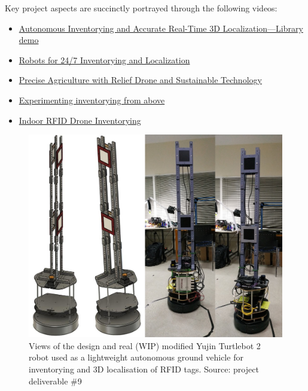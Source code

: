 


Key project aspects are succinctly portrayed through the following videos:

\begin{itemize}
  \singlespacing
  \item \href{https://www.youtube.com/watch?v=bo4lMI640DY}{Autonomous Inventorying and Accurate Real-Time 3D Localization---Library demo}
  \item \href{https://www.facebook.com/watch/?v=960592754415188}{Robots for 24/7 Inventorying and Localization}
  \item \href{https://www.facebook.com/watch/?v=1009958989425825}{Precise Agriculture with Relief Drone and Sustainable Technology}
  \item \href{https://www.facebook.com/watch/?v=1183283855348186}{Experimenting inventorying from above}
  \item \href{https://www.youtube.com/watch?v=9YpBIaO4tgY}{Indoor RFID Drone Inventorying}
\end{itemize}



\begin{figure}[H]\centering
  \includegraphics[scale=0.4]{images/relief/tb/tb_1x4.png}
  \caption{\small Views of the design and real (WIP) modified Yujin Turtlebot 2
           robot used as a lightweight autonomous ground vehicle for
           inventorying and 3D localisation of RFID tags. Source: project
           deliverable \#9}
  \label{fig:relief_tb_1x4}
\end{figure}

